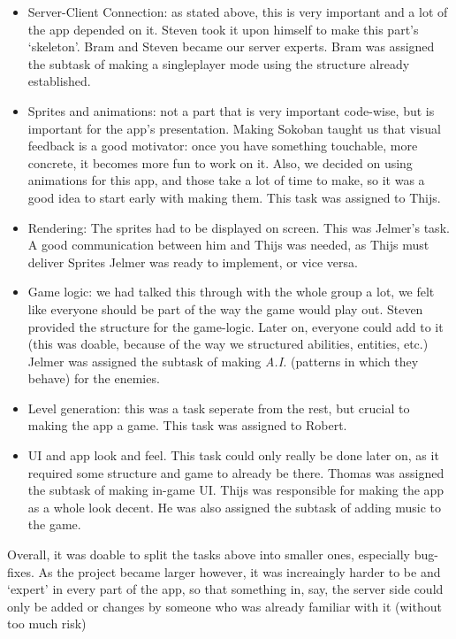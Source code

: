 \documentclass[../main.tex]{subfiles}
\begin{document}
\begin{itemize}
	\item Server-Client Connection: as stated above, this is very important and a lot of the app depended on it. Steven took it upon himself to make this part's `skeleton'. Bram and Steven became our server experts. Bram was assigned the subtask of making a singleplayer mode using the structure already established.
	\item Sprites and animations: not a part that is very important code-wise, but is important for the app's presentation. Making Sokoban taught us that visual feedback is a good motivator: once you have something touchable, more concrete, it becomes more fun to work on it. Also, we decided on using animations for this app, and those take a lot of time to make, so it was a good idea to start early with making them. This task was assigned to Thijs.
	\item Rendering: The sprites had to be displayed on screen. This was Jelmer's task. A good communication between him and Thijs was needed, as Thijs must deliver Sprites Jelmer was ready to implement, or vice versa.
	\item Game logic: we had talked this through with the whole group a lot, we felt like everyone should be part of the way the game would play out. Steven provided the structure for the game-logic. Later on, everyone could add to it (this was doable, because of the way we structured abilities, entities, etc.) Jelmer was assigned the subtask of making \textit{A.I.} (patterns in which they behave) for the enemies. 
	\item Level generation: this was a task seperate from the rest, but crucial to making the app a game. This task was assigned to Robert.
	\item UI and app look and feel. This task could only really be done later on, as it required some structure and game to already be there. Thomas was assigned the subtask of making in-game UI. Thijs was responsible for making the app as a whole look decent. He was also assigned the subtask of adding music to the game.
\end{itemize}

Overall, it was doable to split the tasks above into smaller ones, especially bug-fixes. As the project became larger however, it was increaingly harder to be and `expert' in every part of the app, so that something in, say, the server side could only be added or changes by someone who was already familiar with it (without too much risk)
\end{document}
